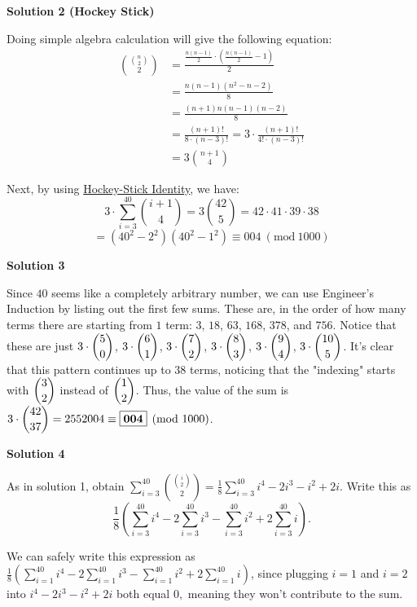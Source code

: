 \begin{enumerate}
 



\textbf{Solution 2 (Hockey Stick)}

Doing simple algebra calculation will give the following equation:
 \begin{align*} \binom{\binom{n}{2}}{2} &= \frac{\frac{n(n-1)}{2} \cdot (\frac{n(n-1)}{2}-1)}{2}\\  &= \frac{n(n-1)(n^2-n-2)}{8}\\  &= \frac{(n+1)n(n-1)(n-2)}{8}\\  &= \frac{(n+1)!}{8\cdot (n-3)!} = 3 \cdot \frac{(n+1)!}{4!\cdot (n-3)!}\\  &= 3 \binom{n+1}{4} \end{align*}


 Next, by using \href{https://artofproblemsolving.com/wiki/index.php?title=Hockey-Stick\_Identity}{Hockey-Stick Identity}, we have:
 \[3 \cdot \sum_{i=3}^{40} \binom{i+1}{4} = 3 \binom{42}{5} = 42 \cdot 41 \cdot 39 \cdot 38\]
 \[=(40^2-2^2)(40^2-1^2) \equiv \boxed{004} ~(\text{mod}~ 1000)\]




\textbf{Solution 3}

Since $40$ seems like a completely arbitrary number, we can use Engineer's Induction by listing out the first few sums. These are, in the order of how many terms there are starting from $1$ term: $3$, $18$, $63$, $168$, $378$, and $756$. Notice that these are just $3 \cdot \dbinom50$, $3 \cdot \dbinom61$, $3 \cdot \dbinom72$, $3 \cdot \dbinom83$, $3 \cdot \dbinom94$, $3 \cdot \dbinom{10}5$. It's clear that this pattern continues up to $38$ terms, noticing that the "indexing" starts with $\dbinom32$ instead of $\dbinom12$. Thus, the value of the sum is $3 \cdot \dbinom{42}{37}=2552004 \equiv \boxed{\textbf{004}} \pmod{1000}$.

 



\textbf{Solution 4}

As in solution 1, obtain $\sum_{i=3}^{40} \binom{\binom{i}{2}}{2} = \frac{1}{8} \sum_{i=3}^{40} i^4-2i^3-i^2+2i.$ Write this as 
 \[\frac{1}{8}\left(\sum_{i=3}^{40} i^4 - 2\sum_{i=3}^{40}i^3 - \sum_{i=3}^{40}i^2 + 2\sum_{i=3}^{40}i\right).\]

 We can safely write this expression as $\frac{1}{8}\left(\sum_{i=1}^{40} i^4 - 2\sum_{i=1}^{40}i^3 - \sum_{i=1}^{40}i^2 + 2\sum_{i=1}^{40}i\right)$, since plugging $i=1$ and $i=2$ into $i^4-2i^3-i^2+2i$ both equal $0,$ meaning they won't contribute to the sum.


\end{enumerate}
